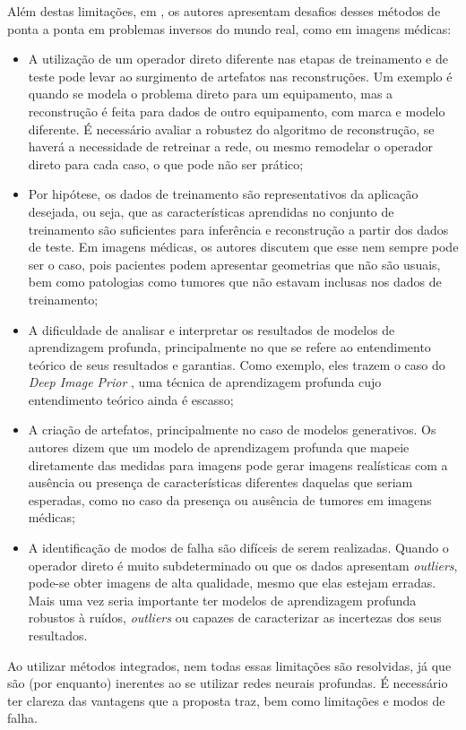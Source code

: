 Além destas limitações, em \cite{Ongie2020}, os autores apresentam desafios desses métodos de ponta a ponta em problemas inversos do mundo real, como em imagens médicas:
 
\begin{itemize}
\item A utilização de um operador direto diferente nas etapas de treinamento e de teste pode levar ao surgimento de artefatos nas reconstruções. Um exemplo é quando se modela o problema direto para um equipamento, mas a reconstrução é feita para dados de outro equipamento, com marca e modelo diferente. É necessário avaliar a robustez do algoritmo de reconstrução, se haverá a necessidade de retreinar a rede, ou mesmo remodelar o operador direto para cada caso, o que pode não ser prático;
\item Por hipótese, os dados de treinamento são representativos da aplicação desejada, ou seja, que as características aprendidas no conjunto de treinamento são suficientes para inferência e reconstrução a partir dos dados de teste. Em imagens médicas, os autores discutem que esse nem sempre pode ser o caso, pois pacientes podem apresentar geometrias que não são usuais, bem como patologias como tumores que não estavam inclusas nos dados de treinamento;
\item A dificuldade de analisar e  interpretar os resultados de modelos de aprendizagem profunda, principalmente no que se refere ao entendimento teórico de seus resultados e garantias. Como exemplo, eles trazem o caso do \textit{Deep Image Prior} \cite{Ulyanov2020}, uma técnica de aprendizagem profunda cujo entendimento teórico ainda é escasso;
\item A criação de artefatos, principalmente no caso de modelos generativos. Os autores dizem que um modelo de aprendizagem profunda que mapeie diretamente das medidas para imagens pode gerar imagens realísticas com a ausência ou presença de características diferentes daquelas que seriam esperadas, como no caso da presença ou ausência de tumores em imagens médicas;
\item A identificação de modos de falha são difíceis de serem realizadas. Quando o operador direto é muito subdeterminado ou que os dados apresentam \textit{outliers}, pode-se obter imagens de alta qualidade, mesmo que elas estejam erradas. Mais uma vez seria importante ter modelos de aprendizagem profunda robustos à ruídos, \textit{outliers} ou  capazes de caracterizar as incertezas dos seus resultados. 
 \end{itemize}
Ao utilizar métodos integrados, nem todas essas limitações são resolvidas, já que são (por enquanto) inerentes ao se utilizar redes neurais profundas. É necessário ter clareza das vantagens que a proposta traz, bem como limitações e modos de falha. 

